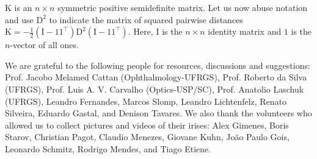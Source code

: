 \documentclass{acmtog} %
\begin{document}
$\mathrm{K}$ is an $n\times n$ symmetric positive semidefinite matrix.
Let us now abuse notation and use $\mathrm{D}^{2}$ to indicate the
matrix of squared pairwise distances $\mathrm{K} =
-\frac{1}{2}(\mathrm{I} -
\mathrm{1}\mathrm{1}^{\top})\mathrm{D}^{2}(\mathrm{I} -
\mathrm{1}\mathrm{1}^{\top})$. Here, $\mathrm{I}$ is the $n \times n$
identity matrix and $\mathrm{1}$ is the $n$-vector of all ones.

\begin{acks}
We are grateful to the following people for resources, discussions and
suggestions: Prof. Jacobo Melamed Cattan (Ophthalmology-UFRGS), Prof.
Roberto da Silva (UFRGS), Prof. Luis A. V. Carvalho (Optics-USP/SC),
Prof. Anatolio Laschuk (UFRGS), Leandro Fernandes, Marcos
Slomp, Leandro Lichtenfelz, Renato Silveira,
Eduardo Gastal, and Denison Tavares. We also thank the volunteers who
allowed us to collect pictures and videos of their irises: Alex Gimenes,
Boris Starov, Christian Pagot, Claudio Menezes, Giovane Kuhn, Jo\~{a}o
Paulo Gois, Leonardo Schmitz, Rodrigo Mendes, and Tiago Etiene.
\end{acks}




\end{document}

